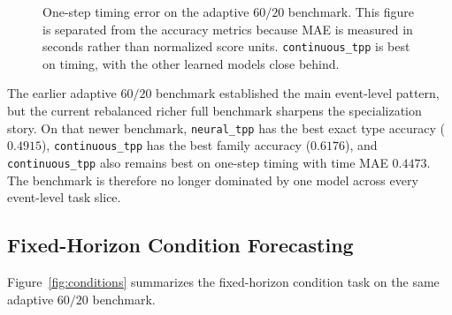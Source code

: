 \documentclass[11pt]{article}
\begin{document}
\begin{figure}[H]
\centering
{}
\caption{One-step timing error on the adaptive \(60/20\) benchmark. This figure is separated from the accuracy metrics because MAE is measured in seconds rather than normalized score units. \texttt{continuous\_tpp} is best on timing, with the other learned models close behind.}
\label{fig:onestep_time}
\end{figure}

The earlier adaptive \(60/20\) benchmark established the main event-level pattern, but the current rebalanced richer full benchmark sharpens the specialization story. On that newer benchmark, \texttt{neural\_tpp} has the best exact type accuracy (\(0.4915\)), \texttt{continuous\_tpp} has the best family accuracy (\(0.6176\)), and \texttt{continuous\_tpp} also remains best on one-step timing with time MAE \(0.4473\). The benchmark is therefore no longer dominated by one model across every event-level task slice.

\subsection{Fixed-Horizon Condition Forecasting}

Figure~\ref{fig:conditions} summarizes the fixed-horizon condition task on the same adaptive \(60/20\) benchmark.
\end{document}
